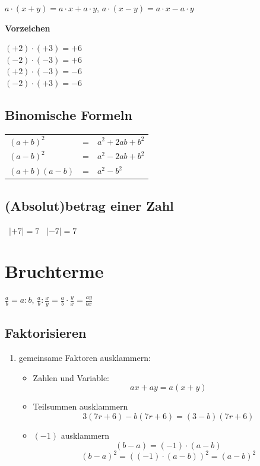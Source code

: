 \begin{multicols}{2}
$a\cdot{}(x+ y) = a\cdot{}x + a\cdot{}y$,\phantom{ and } $a\cdot{}(x - y) = a\cdot{}x - a\cdot{}y$

\textbf{Vorzeichen}

$(+2)\cdot(+3)=+6$\\
$(-2)\cdot(-3)=+6$\\
$(+2)\cdot(-3)=-6$\\
$(-2)\cdot(+3)=-6$\\



\subsection*{Binomische Formeln}
\begin{tabular}{lcl}
 $(a+b)^2$  & =  & $a^2 + 2ab + b^2$ \\
 $(a-b)^2$  & =  & $a^2 - 2ab + b^2$ \\
 $(a+b)(a-b)$  & =  & $a^2 - b^2$
  \end{tabular} 

\subsection*{(Absolut)betrag einer Zahl}%
\hfill\, $|+7| = 7$ \hfill\, $|-7| = 7$ \hfill\, %

\forceCB%
\section*{Bruchterme}
    $\frac{a}b = a : b$,\phantom{ and }  $\frac{a}b : \frac{x}y = \frac{a}b\cdot{}\frac{y}x = \frac{ay}{bx}$
    
\subsection*{Faktorisieren}

\begin{enumerate}
\item gemeinsame Faktoren ausklammern:
\begin{itemize}
\item Zahlen und Variable:
$$ax + ay = a(x+y)$$
\item
Teilsummen ausklammern
$$3(7r+6) - b(7r+6) = (3-b)(7r+6)$$
\item $(-1)$ ausklammern
  $$(b-a)=(-1)\cdot{}(a-b)$$
  $$(b-a)^2 = \left((-1)\cdot{}(a-b)\right)^2 = (a-b)^2$$
\end{itemize}


\end{enumerate}
\end{multicols}
